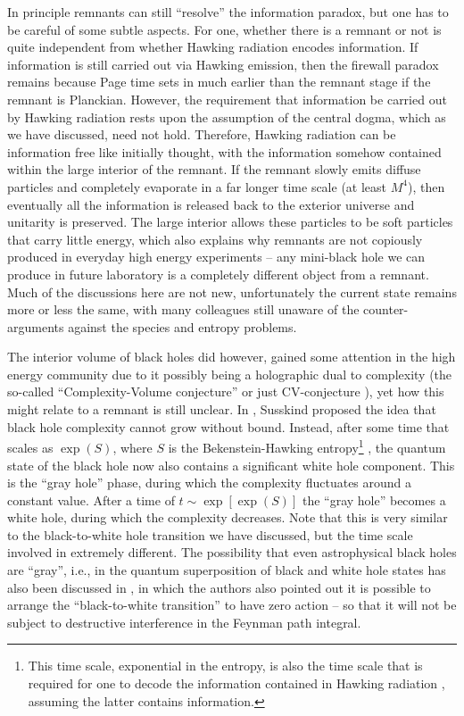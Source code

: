 \documentclass[preprintnumbers, floatfix, preprintnumbers, letterpaper, twocolumn, superscriptaddress,nofootinbib]{revtex4-2}
\begin{document}
In principle remnants can still ``resolve'' the information paradox, but one has to be careful of some subtle aspects. For one, whether there is a remnant or not is quite independent from whether Hawking radiation encodes information. If information is still carried out via Hawking emission, then the firewall paradox remains because Page time sets in much earlier than the remnant stage \cite{1412.8366} if the remnant is Planckian. However, the requirement that information be carried out by Hawking radiation rests upon the assumption of the central dogma, which as we have discussed, need not hold. Therefore, Hawking radiation can be information free like initially thought, with the information somehow contained within the large interior of the remnant. If the remnant slowly emits diffuse particles and completely evaporate in a far longer time scale (at least $M^4$), then eventually all the information is released back to the exterior universe and unitarity is preserved. The large interior allows these particles to be soft particles that carry little energy, which also explains why remnants are not copiously produced in everyday high energy experiments -- any mini-black hole we can produce in future laboratory is a completely different object from a remnant. Much of the discussions here are not new, unfortunately the current state remains more or less the same, with many colleagues still unaware of the counter-arguments against the species and entropy problems. 

The interior volume of black holes did however, gained some attention in the high energy community due to it possibly being a holographic dual to complexity (the so-called ``Complexity-Volume conjecture'' or just CV-conjecture \cite{1402.5674,1403.5695,1406.2678,1411.0690,1509.06614,1911.12561,2312.05731}), yet how this might relate to a remnant is still unclear. In \cite{1507.02287}, Susskind proposed the idea that black hole complexity cannot grow without bound. Instead, after some time that scales as $\exp{(S)}$, where $S$ is the Bekenstein-Hawking entropy\footnote{This time scale, exponential in the entropy, is also the time scale that is required for one to decode the information contained in Hawking radiation \cite{1301.4504}, assuming the latter contains information.} , the quantum state of the black hole now also contains a significant white hole component. This is the ``gray hole'' phase, during which the complexity fluctuates around a constant value. After a time of $t\sim \exp[{\exp{(S)}}]$ the ``gray hole'' becomes a white hole, during which the complexity decreases. Note that this is very similar to the black-to-white hole transition we have discussed, but the time scale involved in extremely different. The possibility that even astrophysical black holes are ``gray'', i.e., in the quantum superposition of black and white hole states has also been discussed in \cite{2304.10692}, in which the authors also pointed out it is possible to arrange the ``black-to-white transition'' to have zero action -- so that it will not be subject to destructive interference in the Feynman path integral.
 
\end{document}
